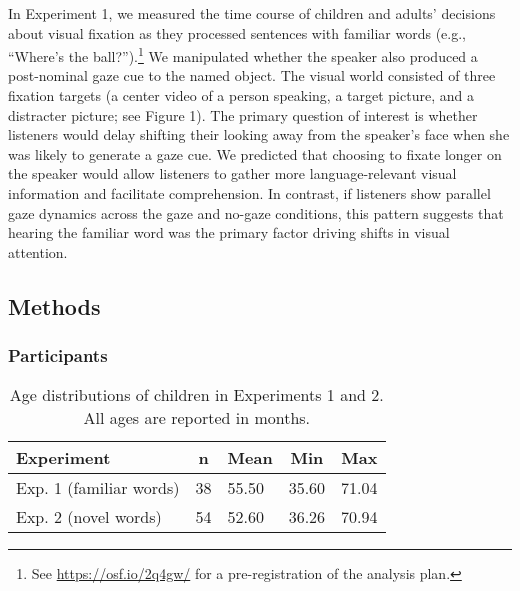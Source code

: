 \documentclass[10pt, letterpaper]{article}
\begin{document}
In Experiment 1, we measured the time course of children and adults'
decisions about visual fixation as they processed sentences with
familiar words (e.g., ``Where's the ball?'').\footnote{See
  \url{https://osf.io/2q4gw/} for a pre-registration of the analysis
  plan.} We manipulated whether the speaker also produced a post-nominal
gaze cue to the named object. The visual world consisted of three
fixation targets (a center video of a person speaking, a target picture,
and a distracter picture; see Figure 1). The primary question of
interest is whether listeners would delay shifting their looking away
from the speaker's face when she was likely to generate a gaze cue. We
predicted that choosing to fixate longer on the speaker would allow
listeners to gather more language-relevant visual information and
facilitate comprehension. In contrast, if listeners show parallel gaze
dynamics across the gaze and no-gaze conditions, this pattern suggests
that hearing the familiar word was the primary factor driving shifts in
visual attention.

\hypertarget{methods}{%
\subsection{Methods}\label{methods}}

\hypertarget{participants}{%
\subsubsection{Participants}\label{participants}}

\begin{table}[tbp]
\begin{center}
\begin{threeparttable}
\caption{\label{tab:make-ss-table}Age distributions of children in Experiments 1 and 2. All ages are reported in months.}
\begin{tabular}{lllll}
\toprule
Experiment & \multicolumn{1}{c}{n} & \multicolumn{1}{c}{Mean} & \multicolumn{1}{c}{Min} & \multicolumn{1}{c}{Max}\\
\midrule
Exp. 1 (familiar words) & 38 & 55.50 & 35.60 & 71.04\\
Exp. 2 (novel words) & 54 & 52.60 & 36.26 & 70.94\\
\bottomrule
\end{tabular}
\end{threeparttable}
\end{center}
\end{table}
\end{document}
